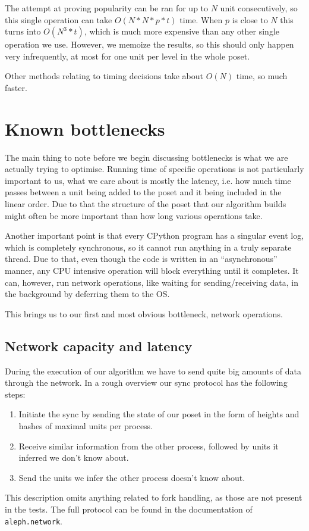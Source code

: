 \documentclass[a4paper,10pt]{article}
\begin{document}
			The attempt at proving popularity can be ran for up to $N$ unit consecutively, so this single operation can take $O(N*N*p*t)$ time.
			When $p$ is close to $N$ this turns into $O(N^3*t)$, which is much more expensive than any other single operation we use.
			However, we memoize the results, so this should only happen very infrequently, at most for one unit per level in the whole poset.

			Other methods relating to timing decisions take about $O(N)$ time, so much faster.
	\section{Known bottlenecks}
		The main thing to note before we begin discussing bottlenecks is what we are actually trying to optimise.
		Running time of specific operations is not particularly important to us, what we care about is mostly the latency,
		i.e. how much time passes between a unit being added to the poset and it being included in the linear order.
		Due to that the structure of the poset that our algorithm builds might often be more important than how long various operations take.

		Another important point is that every CPython program has a singular event log, which is completely synchronous, so it cannot run anything in a truly separate thread.
		Due to that, even though the code is written in an ``asynchronous'' manner, any CPU intensive operation will block everything until it completes.
		It can, however, run network operations, like waiting for sending/receiving data, in the background by deferring them to the OS.

		This brings us to our first and most obvious bottleneck, network operations.
		\subsection{Network capacity and latency}
			During the execution of our algorithm we have to send quite big amounts of data through the network.
			In a rough overview our sync protocol has the following steps:
			\begin{enumerate}
				\item Initiate the sync by sending the state of our poset in the form of heights and hashes of maximal units per process.
				\item Receive similar information from the other process, followed by units it inferred we don't know about.
				\item Send the units we infer the other process doesn't know about.
			\end{enumerate}
			This description omits anything related to fork handling, as those are not present in the tests.
			The full protocol can be found in the documentation of \lstinline{aleph.network}.
\end{document}
